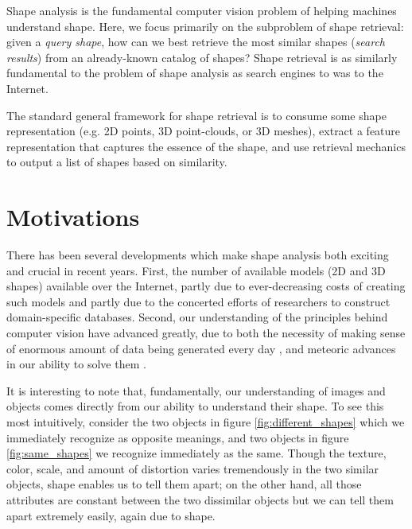 \documentclass[../tech_report_1.tex]{subfiles}
\begin{document}
Shape analysis is the fundamental computer vision problem of helping machines understand shape. Here, we focus primarily on the subproblem of shape retrieval: given a \textit{query shape}, how can we best retrieve the most similar shapes (\textit{search results}) from an already-known catalog of shapes? Shape retrieval is as similarly fundamental to the problem of shape analysis as search engines to was to the Internet.

The standard general framework for shape retrieval is to consume some shape representation (e.g. 2D points, 3D point-clouds, or 3D meshes), extract a feature representation that captures the essence of the shape, and use retrieval mechanics to output a list of shapes based on similarity.

\section{Motivations}

There has been several developments which make shape analysis both exciting and crucial in recent years. First, the number of available models (2D and 3D shapes) available over the Internet, partly due to ever-decreasing costs of creating such models and partly due to the concerted efforts of researchers to construct domain-specific databases. Second, our understanding of the principles behind computer vision have advanced greatly, due to both the necessity of making sense of enormous amount of data being generated every day \cite{manyika2011big}, and meteoric advances in our ability to solve them \cite{krizhevsky2012imagenet}.

It is interesting to note that, fundamentally, our understanding of images and objects comes directly from our ability to understand their shape. To see this most intuitively, consider the two objects in figure \ref{fig:different_shapes} which we immediately recognize as opposite meanings, and two objects in figure \ref{fig:same_shapes} we recognize immediately as the same. Though the texture, color, scale, and amount of distortion varies tremendously in the two similar objects, shape enables us to tell them apart; on the other hand, all those attributes are constant between the two dissimilar objects but we can tell them apart extremely easily, again due to shape.
\end{document}

